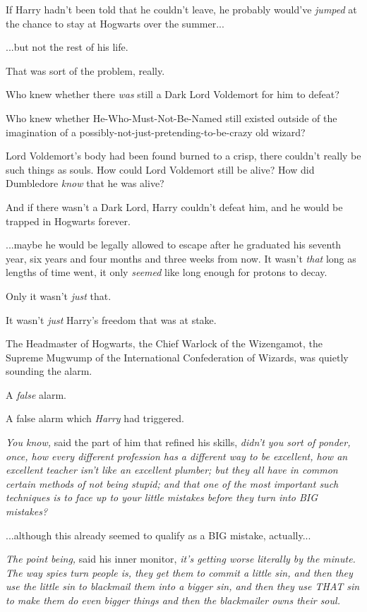 If Harry hadn't been told that he couldn't leave, he probably would've
\emph{jumped} at the chance to stay at Hogwarts over the summer...

...but not the rest of his life.

That was sort of the problem, really.

Who knew whether there \emph{was} still a Dark Lord Voldemort for him to
defeat?

Who knew whether He-Who-Must-Not-Be-Named still existed outside of the
imagination of a possibly-not-just-pretending-to-be-crazy old wizard?

Lord Voldemort's body had been found burned to a crisp, there couldn't
really be such things as souls. How could Lord Voldemort still be alive?
How did Dumbledore \emph{know} that he was alive?

And if there wasn't a Dark Lord, Harry couldn't defeat him, and he would
be trapped in Hogwarts forever.

...maybe he would be legally allowed to escape after he graduated
his seventh year, six years and four months and three weeks from now. It
wasn't \emph{that} long as lengths of time went, it only \emph{seemed}
like long enough for protons to decay.

Only it wasn't \emph{just} that.

It wasn't \emph{just} Harry's freedom that was at stake.

The Headmaster of Hogwarts, the Chief Warlock of the Wizengamot, the
Supreme Mugwump of the International Confederation of Wizards, was
quietly sounding the alarm.

A \emph{false} alarm.

A false alarm which \emph{Harry} had triggered.

\emph{You know,} said the part of him that refined his skills,
\emph{didn't you sort of ponder, once, how every different profession
has a different way to be excellent, how an excellent teacher isn't like
an excellent plumber; but they all have in common certain methods of not
being stupid; and that one of the most important such techniques is to
face up to your little mistakes before they turn into BIG mistakes?}

...although this already seemed to qualify as a BIG mistake,
actually...

\emph{The point being,} said his inner monitor, \emph{it's getting worse
literally by the minute. The way spies turn people is, they get them to
commit a little sin, and then they use the little sin to blackmail them
into a bigger sin, and then they use THAT sin to make them do even
bigger things and then the blackmailer owns their soul.}

